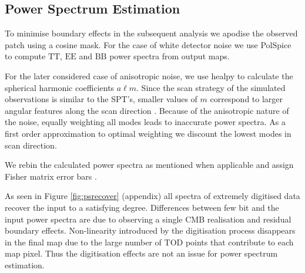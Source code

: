 \documentclass[a4paper,fleqn,usenatbib]{mnras}
\begin{document}




\subsection{Power Spectrum Estimation}
\label{subsec:psestimation}

To minimise boundary effects in the subsequent analysis we apodise the observed patch using a cosine mask. For the case of white detector noise we use PolSpice \citep{polspice} to compute $\mathrm{TT}$, $\mathrm{EE}$ and $\mathrm{BB}$ power spectra from output maps. 

For the later considered case of anisotropic noise, we use healpy to calculate the spherical harmonic coefficients $a\ell m$. Since the scan strategy of the simulated observations is similar to the SPT's, smaller values of $m$ correspond to larger angular features along the scan direction \citep{chown2018}. Because of the anisotropic nature of the noise, equally weighting all modes leads to inaccurate power spectra. As a first order approximation to optimal weighting we discount the lowest modes in scan direction.

We rebin the calculated power spectra as mentioned when applicable and assign Fisher matrix error bars \citep{tegmarkdesignersguide1997}.

As seen in Figure \ref{fig:psrecover} (appendix) all spectra of extremely digitised data recover the input to a satisfying degree. Differences between few bit and the input power spectra are due to observing a single CMB realisation and residual boundary effects. Non-linearity introduced by the digitisation process disappears in the final map due to the large number of TOD points that contribute to each map pixel. Thus the digitisation effects are not an issue for power spectrum estimation.
\end{document}

